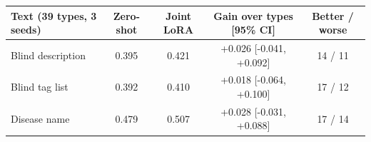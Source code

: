\begin{tabular}{lcccc}\toprule Text (39 types, 3 seeds) & Zero-shot & Joint LoRA & Gain over types [95\% CI] & Better / worse\\\midrule
Blind description & 0.395 & 0.421 & +0.026 [-0.041, +0.092] & 14 / 11\\
Blind tag list & 0.392 & 0.410 & +0.018 [-0.064, +0.100] & 17 / 12\\
Disease name & 0.479 & 0.507 & +0.028 [-0.031, +0.088] & 17 / 14\\
\bottomrule\end{tabular}
